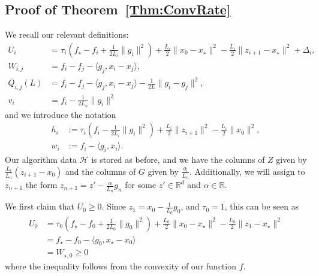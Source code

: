\documentclass[11pt]{article}
\numberwithin{equation}{section}
\newcommand{\R}{\mathbb{R}}
\newcommand{\Mem}{\mathcal{H}}
\newcommand{\dotp}[2]{\langle {#1}, {#2} \rangle}
\newcommand{\norm}[1]{\|{#1}\|}
\theoremstyle{definition}
\theoremstyle{plain}
\theoremstyle{definition}
\begin{document}
\subsection{Proof of Theorem~\ref{Thm:ConvRate}} \label{SubSec:ConvRateProof}

We recall our relevant definitions:
\begin{align*}
    U_i & = \tau_i\left(f_\star - f_i + \frac{1}{2 L_i}\norm{g_i}^2\right) + \frac{L_i}{2}\norm{x_0-x_\star}^2-\frac{L_i}{2}\norm{z_{i+1}-x_\star}^2 + \Delta_i, \\
    W_{i,j} & = f_i - f_j - \dotp{g_j}{x_i - x_j}, \\
    Q_{i,j}(L) & = f_i - f_j - \dotp{g_j}{x_i - x_j} - \frac{1}{2 L} \norm{g_i - g_j}^2, \\
    v_i & = f_i - \frac{1}{2L_n}\norm{g_i}^2
\end{align*}
and we introduce the notation
\begin{align*}
    h_i & := \tau_i(f_i - \frac{1}{2L_i}\norm{g_i}^2) + \frac{L_i}{2}\norm{z_{i+1}}^2 - \frac{L_i}{2}\norm{x_0}^2, \\
    w_i & := f_i - \dotp{g_i}{x_i}.
\end{align*}
Our algorithm data $\Mem$ is stored as before, and we have the columns of $Z$ given by $\frac{L_i}{L_n}(z_{i+1} - x_0)$ and the columns of $G$ given by $\frac{g_i}{L_n}$. Additionally, we will assign to $z_{n+1}$ the form $z_{n+1} = z' - \frac{\alpha}{L_n} g_n$ for some $z' \in \R^d$ and  $\alpha \in \R$.

We first claim that $U_0 \geq 0$. Since $z_1 = x_0 - \frac{1}{L_0} g_0$, and $\tau_0 = 1$, this can be seen as
\begin{align*}
    U_0 &= \tau_0\left(f_\star - f_0 + \frac{1}{2 L_0}\norm{g_0}^2\right) + \frac{L_0}{2}\norm{x_0-x_\star}^2-\frac{L_0}{2}\norm{z_1-x_\star}^2 \\
    & = f_\star - f_0 - \dotp{g_0}{x_\star - x_0} \\
    & = W_{\star,0} \geq 0
\end{align*}
where the inequality follows from the convexity of our function $f$.
\end{document}
